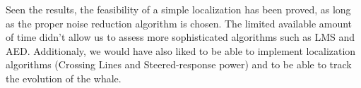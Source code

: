 Seen the results, the feasibility of a simple localization has been proved, as long as the proper noise reduction algorithm is chosen. The limited available amount of time didn't allow us to assess more sophisticated algorithms such as LMS and AED. Additionaly, we would have also liked to be able to implement localization algorithms (Crossing Lines and Steered-response power) and to be able to track the evolution of the whale.
